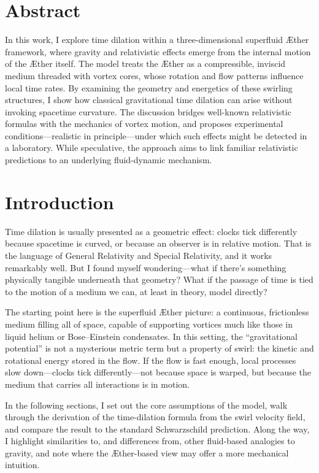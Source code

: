 \documentclass[11pt]{article}
\begin{document}
\section*{Abstract}

In this work, I explore time dilation within a three-dimensional superfluid Æther framework, where gravity and relativistic effects emerge from the internal motion of the Æther itself. The model treats the Æther as a compressible, inviscid medium threaded with vortex cores, whose rotation and flow patterns influence local time rates. By examining the geometry and energetics of these swirling structures, I show how classical gravitational time dilation can arise without invoking spacetime curvature. The discussion bridges well-known relativistic formulas with the mechanics of vortex motion, and proposes experimental conditions—realistic in principle—under which such effects might be detected in a laboratory. While speculative, the approach aims to link familiar relativistic predictions to an underlying fluid-dynamic mechanism.

\section*{Introduction}

Time dilation is usually presented as a geometric effect: clocks tick differently because spacetime is curved, or because an observer is in relative motion. That is the language of General Relativity and Special Relativity, and it works remarkably well. But I found myself wondering—what if there’s something physically tangible underneath that geometry? What if the passage of time is tied to the motion of a medium we can, at least in theory, model directly?

The starting point here is the superfluid Æther picture: a continuous, frictionless medium filling all of space, capable of supporting vortices much like those in liquid helium or Bose–Einstein condensates. In this setting, the “gravitational potential” is not a mysterious metric term but a property of swirl: the kinetic and rotational energy stored in the flow. If the flow is fast enough, local processes slow down—clocks tick differently—not because space is warped, but because the medium that carries all interactions is in motion.

In the following sections, I set out the core assumptions of the model, walk through the derivation of the time-dilation formula from the swirl velocity field, and compare the result to the standard Schwarzschild prediction. Along the way, I highlight similarities to, and differences from, other fluid-based analogies to gravity, and note where the Æther-based view may offer a more mechanical intuition.
\end{document}
